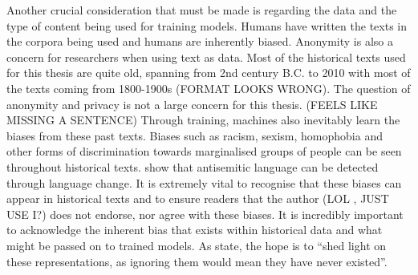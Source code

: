 Another crucial consideration that must be made is regarding the data and the type of content being used for training models. Humans have written the texts in the corpora being used and humans are inherently biased. Anonymity is also a concern for researchers when using text as data. Most of the historical texts used for this thesis are quite old, spanning from 2nd century B.C. to 2010 with most of the texts coming from 1800-1900s (FORMAT LOOKS WRONG). The question of anonymity and privacy is not a large concern for this thesis. (FEELS LIKE MISSING A SENTENCE) Through training, machines also inevitably learn the biases from these past texts. Biases such as racism, sexism, homophobia and other forms of discrimination towards marginalised groups of people can be seen throughout historical texts. \citet{tripodi-etal-2019-tracing} show that antisemitic language can be detected through language change. It is extremely vital to recognise that these biases can appear in historical texts and to ensure readers that the author (LOL , JUST USE I?) does not endorse, nor agree with these biases. It is incredibly important to acknowledge the inherent bias that exists within historical data and what might be passed on to trained models. As \citet{hengchen-tahmasebi_2021-swedishdiachronic} state, the hope is to “shed light on these representations, as ignoring them would mean they have never existed”. 
